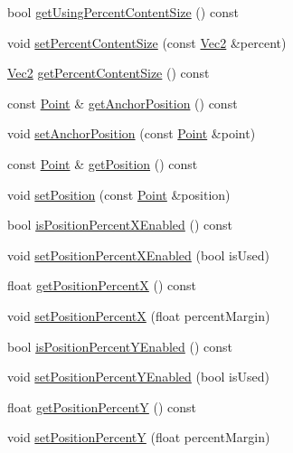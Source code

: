 \begin{DoxyCompactItemize}
bool \hyperlink{classui_1_1LayoutComponent_abd8b705e269551116208cec448cd230e}{get\+Using\+Percent\+Content\+Size} () const
\item 
void \hyperlink{classui_1_1LayoutComponent_ac1b75e3b3340dfeead80af4bc6732ef5}{set\+Percent\+Content\+Size} (const \hyperlink{classVec2}{Vec2} \&percent)
\item 
\hyperlink{classVec2}{Vec2} \hyperlink{classui_1_1LayoutComponent_a504d9311e533c902d44aa415f9027a4f}{get\+Percent\+Content\+Size} () const
\item 
const \hyperlink{classVec2}{Point} \& \hyperlink{classui_1_1LayoutComponent_a942813605e5bb99f6722e8cafe82f87a}{get\+Anchor\+Position} () const
\item 
void \hyperlink{classui_1_1LayoutComponent_ae6d9fb9a3ca2f54076975d7723bb9f16}{set\+Anchor\+Position} (const \hyperlink{classVec2}{Point} \&point)
\item 
const \hyperlink{classVec2}{Point} \& \hyperlink{classui_1_1LayoutComponent_a666e2c092d4db37768ab1cd9acd50a91}{get\+Position} () const
\item 
void \hyperlink{classui_1_1LayoutComponent_ac965de551371d6087f29d3bcfccb11d9}{set\+Position} (const \hyperlink{classVec2}{Point} \&position)
\item 
bool \hyperlink{classui_1_1LayoutComponent_a6918d9366c8e524788cbe58f786d8075}{is\+Position\+Percent\+X\+Enabled} () const
\item 
void \hyperlink{classui_1_1LayoutComponent_ae6140372921e1fd10034d9b8b90a4d7a}{set\+Position\+Percent\+X\+Enabled} (bool is\+Used)
\item 
float \hyperlink{classui_1_1LayoutComponent_a91fb3991c0d9da922b53f58c8453fcbf}{get\+Position\+PercentX} () const
\item 
void \hyperlink{classui_1_1LayoutComponent_a4461080a849760acbc7f9435e34286b9}{set\+Position\+PercentX} (float percent\+Margin)
\item 
bool \hyperlink{classui_1_1LayoutComponent_afdcda91cca2879a420c406c785c58284}{is\+Position\+Percent\+Y\+Enabled} () const
\item 
void \hyperlink{classui_1_1LayoutComponent_a820438ea0ef37dd3570ef21d9a3392ab}{set\+Position\+Percent\+Y\+Enabled} (bool is\+Used)
\item 
float \hyperlink{classui_1_1LayoutComponent_a3a997e5b6296efbbe01ca923b8dcf7b4}{get\+Position\+PercentY} () const
\item 
void \hyperlink{classui_1_1LayoutComponent_a3bdc6df3202598dd866ec8c2fb1d10e6}{set\+Position\+PercentY} (float percent\+Margin)

\end{DoxyCompactItemize}
